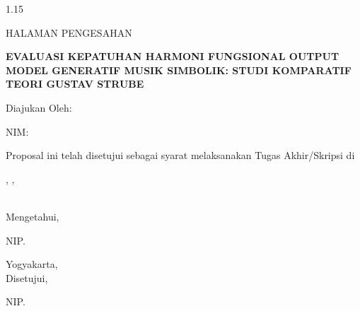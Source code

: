 
\newpage
\begin{spacing}{1.15}
\begin{center}
    HALAMAN PENGESAHAN\par
    \vspace{1cm}
    \textbf{EVALUASI KEPATUHAN HARMONI FUNGSIONAL OUTPUT MODEL GENERATIF MUSIK SIMBOLIK: STUDI KOMPARATIF TEORI GUSTAV STRUBE}\par
    \vspace{0.5cm}
    Diajukan Oleh:\par
    \researchername\par
    NIM: \researchernim\par
    \vspace{1.5cm}
    Proposal ini telah disetujui sebagai syarat melaksanakan Tugas Akhir/Skripsi di\par
    \programstudy, \facultyname,\par
    \institutionname\par
    \vspace{2cm}
    
    \begin{minipage}[t]{0.45\textwidth}
        \centering
        ~\\
        Mengetahui,\par
        \vspace{3cm}
        \textbf{\advisoracademic}\par
        NIP. \advisoracademicnip
    \end{minipage}
    \hfill
    \begin{minipage}[t]{0.45\textwidth}
        \centering
        Yogyakarta, \makebox[3cm]{\hrulefill}\\
        Disetujui,\par
        \vspace{3cm}
        \textbf{\advisorthesis}\par
        NIP. \advisorthesisnip
    \end{minipage}
\end{center}
\end{spacing}

